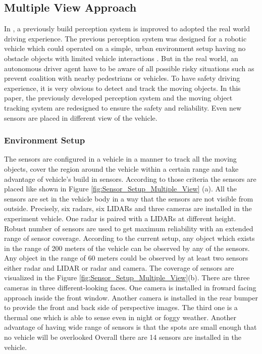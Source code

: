 \subsection{Multiple View Approach}
In \cite{Cho_2014}, a previously build perception system is improved to adopted the real world driving experience. The previous perception system was designed for a robotic vehicle which could operated on a simple, urban environment setup having no obstacle objects with limited vehicle interactions \cite{Cho_2014}. But in the real world, an autonomous driver agent have to be aware of all possible risky situations such as prevent coalition with nearby pedestrians or vehicles. To have safety driving experience, it is very obvious to detect and track the moving objects. In this paper\cite{Cho_2014}, the previously developed perception system and the moving object tracking system are redesigned to ensure the safety and reliability. Even new sensors are placed in different view of the vehicle.


\subsubsection{Environment Setup}
The sensors are configured in a vehicle in a manner to track all the moving objects, cover the region around the vehicle within a certain range and take advantage of vehicle's build in sensors. According to those criteria the sensors are placed like shown in Figure \ref{fig:Sensor_Setup_Multiple_View} (a). All the sensors are set in the vehicle body in a way that the sensors are not visible from outside. Precisely, six radars, six LIDARs and three cameras are installed in the experiment vehicle. One radar is paired with a LIDARs at different height. Robust number of sensors are used to get maximum reliability with an extended range of sensor coverage. According to \cite{Cho_2014} the current setup, any object which exists in the range of 200 meters of the vehicle can be observed by any of the sensors. Any object in the range of 60 meters could be observed by at least two sensors either radar and LIDAR or radar and camera. The coverage of sensors are visualized in the Figure \ref{fig:Sensor_Setup_Multiple_View}(b). There are three cameras in three different-looking faces. One camera is installed in froward facing approach inside the front window. Another camera is installed in the rear bumper to provide the front and back side of perspective images. The third one is a thermal one which is able to sense even in night or foggy weather. Another advantage of having wide range of sensors is that the spots are small enough that no vehicle will be overlooked\cite{Cho_2014} Overall there are 14 sensors are installed in the vehicle.

